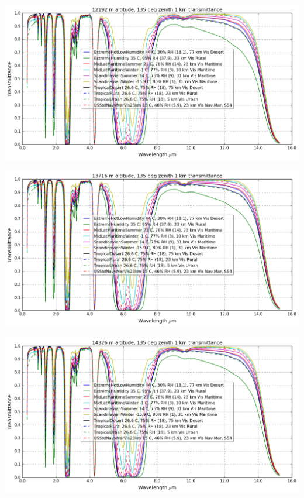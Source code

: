 \documentclass{workpackage}
\begin{document}
\begin{center}
\includegraphics{./pic/Analyse-Standard-Atmospheres_17_19.png}
\end{center}

\begin{center}
\includegraphics{./pic/Analyse-Standard-Atmospheres_17_20.png}
\end{center}

\begin{center}
\includegraphics{./pic/Analyse-Standard-Atmospheres_17_21.png}
\end{center}
\end{document}
